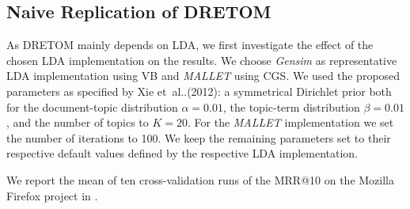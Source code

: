 \documentclass[a4paper,twoside]{article}
\makeatletter
\newcommand{\mozff}{Mozilla Firefox}
\DeclareRobustCommand\onedot{\futurelet\@let@token\@onedot}
\def\@onedot{\ifx\@let@token.\else.\null\fi\xspace}
\def\etal{et~al\onedot}
\makeatother
\begin{document}
\setcounter{footnote}{5}

\subsection{Naive Replication of DRETOM}
\label{sec:exp1-3}

As \ac{DRETOM} mainly depends on \ac{LDA}, we first investigate the effect of the chosen \ac{LDA} implementation on the results.
We choose \textit{Gensim} as representative \ac{LDA} implementation using \ac{VB} and \textit{MALLET} using \ac{CGS}.
We used the proposed parameters as specified by Xie \etal (2012): a symmetrical Dirichlet prior both for the document-topic distribution $\alpha = 0.01$, the topic-term distribution $\beta = 0.01$, and the number of topics to $K= 20$.
For the \textit{MALLET} implementation we set the number of iterations to 100.
We keep the remaining parameters set to their respective default values defined by the respective \ac{LDA} implementation.

We report the mean of ten cross-validation runs of the \ac{MRR}@10 on the \mozff{} project in .
\end{document}
